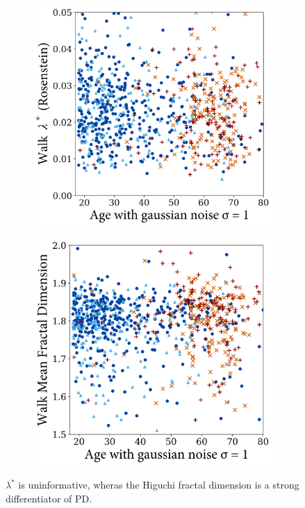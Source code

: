 \documentclass[12pt, twoside]{book}
\begin{document}
\begin{figure}[h]
	\centering
	\begin{subfigure}{.42\textwidth}
		\centering
		\includegraphics[width=0.96\linewidth]{walk_l1.png}
	\end{subfigure}%
	\begin{subfigure}{.42\textwidth}
		\centering
		\includegraphics[width=0.96\linewidth]{fractal_dim_walk.png}
	\end{subfigure}
	\caption{$\lambda^*$ is uninformative, wheras the Higuchi fractal dimension is a strong differentiator of PD. }
	\label{dynamicwalk}
\end{figure}
\end{document}
